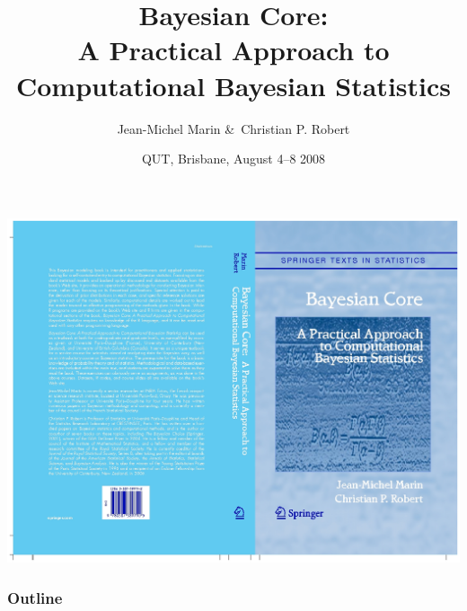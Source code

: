 \documentclass{beamer}
\title{Bayesian Core:\\A Practical Approach to
Computational Bayesian Statistics}
\author{Jean-Michel Marin \&\ Christian P. Robert}
\date{QUT, Brisbane, August 4--8 2008}
\newenvironment{slide}%
 {\begin{frame}}%
 {\end{frame}}
\newcommand{\slidetitle}{\frametitle}
\begin{document}
\begin{slide}
  \titlepage
  \centerline{\includegraphics[height=5truecm]{BCS.ps}}
\end{slide}

\begin{slide}
  \slidetitle{Outline}
  {\small
  \tableofcontents[subsectionstyle=hide]
  }
\end{slide}








\end{document}
